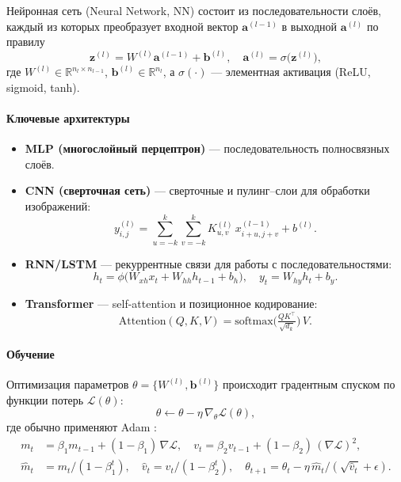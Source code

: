 Нейронная сеть (Neural Network, NN) состоит из последовательности слоёв,
каждый из которых преобразует входной вектор $\mathbf{a}^{(l-1)}$ в
выходной $\mathbf{a}^{(l)}$ по правилу
\begin{equation}
  \mathbf{z}^{(l)} = W^{(l)}\mathbf{a}^{(l-1)} + \mathbf{b}^{(l)}, 
  \quad
  \mathbf{a}^{(l)} = \sigma\bigl(\mathbf{z}^{(l)}\bigr),
  \label{eq:nn_forward_full}
\end{equation}
где $W^{(l)}\in\mathbb{R}^{n_l\times n_{l-1}}$, 
$\mathbf{b}^{(l)}\in\mathbb{R}^{n_l}$,
а $\sigma(\cdot)$ — элементная активация (ReLU, sigmoid, tanh).

\paragraph{Ключевые архитектуры}
\begin{itemize}
  \item \textbf{MLP (многослойный перцептрон)} — последовательность полносвязных слоёв.
  \item \textbf{CNN (сверточная сеть)} — сверточные и пулинг–слои для обработки изображений:
    \[
      y_{i,j}^{(l)} = \sum_{u=-k}^k\sum_{v=-k}^k
      K_{u,v}^{(l)}\,x_{i+u,j+v}^{(l-1)} + b^{(l)}.
      \label{eq:cnn_full}
    \]
  \item \textbf{RNN/LSTM} — рекуррентные связи для работы с последовательностями:
    \begin{equation}
      h_t = \phi\bigl(W_{xh}x_t + W_{hh}h_{t-1} + b_h\bigr),
      \quad
      y_t = W_{hy}h_t + b_y.
      \label{eq:rnn_full}
    \end{equation}
  \item \textbf{Transformer} — self-attention и позиционное кодирование:
    \[
      \mathrm{Attention}(Q,K,V) = \mathrm{softmax}\!\bigl(\tfrac{QK^\top}{\sqrt{d_k}}\bigr)\,V.
      \label{eq:attention_full}
    \]
\end{itemize}

\paragraph{Обучение}
Оптимизация параметров $\theta=\{W^{(l)},\mathbf{b}^{(l)}\}$ происходит
градентным спуском по функции потерь $\mathcal{L}(\theta)$:
\begin{equation}
  \theta \leftarrow \theta - \eta\,\nabla_\theta \mathcal{L}(\theta),
  \label{eq:gd_full}
\end{equation}
где обычно применяют Adam \cite{Kingma2015}:
\begin{align}
  m_t &= \beta_1 m_{t-1} + (1-\beta_1)\,\nabla\mathcal{L},\quad
  v_t = \beta_2 v_{t-1} + (1-\beta_2)\,(\nabla\mathcal{L})^2, \nonumber\\
  \hat m_t &= m_t/(1-\beta_1^t),\quad
  \hat v_t = v_t/(1-\beta_2^t),\quad
  \theta_{t+1} = \theta_t - \eta\,\hat m_t/(\sqrt{\hat v_t}+\epsilon).
  \label{eq:adam_full}
\end{align}

